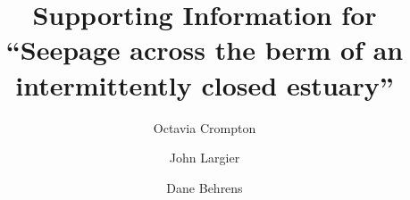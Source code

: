 \documentclass[preprint,12pt,authoryear]{elsarticle}
\begin{document}
\begin{frontmatter}



\title{Supporting Information for ``Seepage across the berm of an intermittently closed estuary'' }

\author[ars]{Octavia Crompton}

\author[bml]{John Largier}
            

\author[esa]{Dane Behrens}



\end{frontmatter}


\newpage
\end{document}
